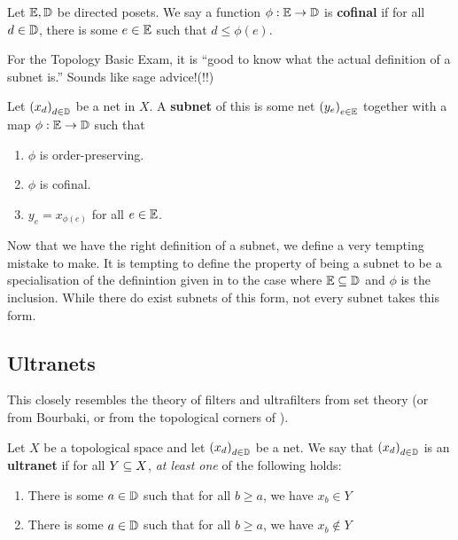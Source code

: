 \begin{boxdefinition}[Cofinality]
    Let $\mathbb{E}, \mathbb{D}$ be directed posets. We say a function $\phi : \mathbb{E} \to \mathbb{D}$ is \textbf{cofinal} if for all $d \in \mathbb{D}$, there is some $e \in \mathbb{E}$ such that $d \leq \phi(e)$.
\end{boxdefinition}

For the Topology Basic Exam, it is ``good to know what the actual definition of a subnet is.'' Sounds like sage advice!(!!)

\begin{boxdefinition}[Subnet]\label{Ch2:Def:Subnet}
    Let $\left( x_d \right)_{d \in \mathbb{D}}$ be a net in $X$. A \textbf{subnet} of this is some net $\left( y_e \right)_{e \in \mathbb{E}}$ together with a map $\phi : \mathbb{E} \to \mathbb{D}$ such that
    \begin{enumerate}
        \item $\phi$ is order-preserving.
        \item $\phi$ is cofinal.
        \item $y_e = x_{\phi(e)}$ for all $e \in \mathbb{E}$.
    \end{enumerate}
\end{boxdefinition}

Now that we have the right definition of a subnet, we define a very tempting mistake to make. It is tempting to define the property of being a subnet to be a specialisation of the definintion given in  to the case where $\mathbb{E} \subseteq \mathbb{D}$ and $\phi$ is the inclusion. While there do exist subnets of this form, not every subnet takes this form.

\subsection{Ultranets}

This closely resembles the theory of filters and ultrafilters from set theory (or from Bourbaki, or from the topological corners of \mathlib).

\begin{boxdefinition}[Ultranet]\label{Ch2:Def:Ultranet}
    Let $X$ be a topological space and let $\left( x_d \right)_{d \in \mathbb{D}}$ be a net. We say that $\left( x_d \right)_{d \in \mathbb{D}}$ is an \textbf{ultranet} if for all $Y \subseteq X$, \textit{at least one} of the following holds:
    \begin{enumerate}
        \item There is some $a \in \mathbb{D}$ such that for all $b \geq a$, we have $x_b \in Y$
        \item There is some $a \in \mathbb{D}$ such that for all $b \geq a$, we have $x_b \notin Y$
    \end{enumerate}
\end{boxdefinition}

